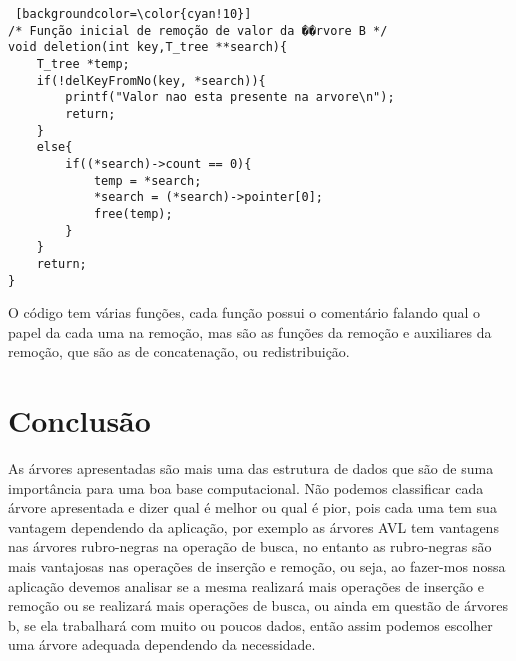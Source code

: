 \documentclass[report]{uftex}
\begin{document}
\begin{lstlisting} [backgroundcolor=\color{cyan!10}]
/* Função inicial de remoção de valor da ��rvore B */
void deletion(int key,T_tree **search){
    T_tree *temp;
    if(!delKeyFromNo(key, *search)){
        printf("Valor nao esta presente na arvore\n");
        return;
    }
	else{
        if((*search)->count == 0){
            temp = *search;
            *search = (*search)->pointer[0];
            free(temp);
        }
    }
    return;
}
\end{lstlisting}

O código tem várias funções, cada função possui o comentário falando qual o papel da cada uma na remoção, mas são as funções da remoção e auxiliares da remoção, que são as de concatenação, ou redistribuição.


\chapter{Conclusão}
\label{ape:Conclusão}

\noindent As árvores apresentadas são mais uma das estrutura de dados que são de suma importância para uma boa base computacional. Não podemos classificar cada árvore apresentada e dizer qual é melhor ou qual é pior, pois cada uma tem sua vantagem dependendo da aplicação, por exemplo as árvores AVL tem vantagens nas árvores rubro-negras na operação de busca, no entanto as rubro-negras são mais vantajosas nas operações de inserção e remoção, ou seja, ao fazer-mos nossa aplicação devemos analisar se a mesma realizará mais operações de inserção e remoção ou se realizará mais operações de busca, ou ainda em questão de árvores b, se ela trabalhará com muito ou poucos dados, então assim podemos escolher uma árvore adequada dependendo da necessidade.

    \nocite{NZ}
    \nocite{PN} 
    \nocite{DT}
    
    
\end{document}
